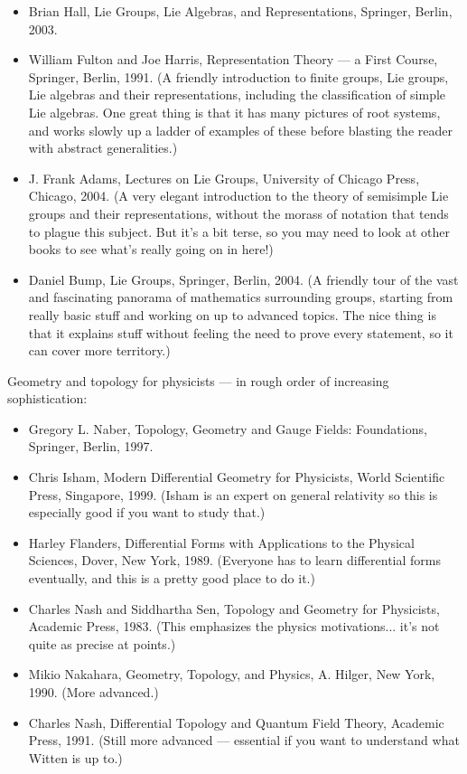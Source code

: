 \documentclass[10pt,a4paper]{book}
\theoremstyle{definition}
\begin{document}
\begin{itemize}
\item Brian Hall, Lie Groups, Lie Algebras, and Representations, Springer, Berlin, 2003.
\item William Fulton and Joe Harris, Representation Theory — a First Course, Springer, Berlin, 1991. (A friendly introduction to finite groups, Lie groups, Lie algebras and their representations, including the classification of simple Lie algebras. One great thing is that it has many pictures of root systems, and works slowly up a ladder of examples of these before blasting the reader with abstract generalities.)
\item J. Frank Adams, Lectures on Lie Groups, University of Chicago Press, Chicago, 2004. (A very elegant introduction to the theory of semisimple Lie groups and their representations, without the morass of notation that tends to plague this subject. But it's a bit terse, so you may need to look at other books to see what's really going on in here!)
\item Daniel Bump, Lie Groups, Springer, Berlin, 2004. (A friendly tour of the vast and fascinating panorama of mathematics surrounding groups, starting from really basic stuff and working on up to advanced topics. The nice thing is that it explains stuff without feeling the need to prove every statement, so it can cover more territory.)
\end{itemize}

Geometry and topology for physicists — in rough order of increasing sophistication:

\begin{itemize}
\item Gregory L. Naber, Topology, Geometry and Gauge Fields: Foundations, Springer, Berlin, 1997.
\item Chris Isham, Modern Differential Geometry for Physicists, World Scientific Press, Singapore, 1999. (Isham is an expert on general relativity so this is especially good if you want to study that.)
\item Harley Flanders, Differential Forms with Applications to the Physical Sciences, Dover, New York, 1989. (Everyone has to learn differential forms eventually, and this is a pretty good place to do it.)
\item Charles Nash and Siddhartha Sen, Topology and Geometry for Physicists, Academic Press, 1983. (This emphasizes the physics motivations... it's not quite as precise at points.)
\item Mikio Nakahara, Geometry, Topology, and Physics, A. Hilger, New York, 1990. (More advanced.)
\item Charles Nash, Differential Topology and Quantum Field Theory, Academic Press, 1991. (Still more advanced — essential if you want to understand what Witten is up to.)
\end{itemize}
\end{document}
